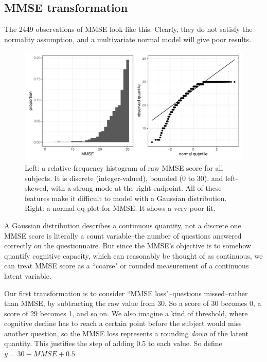 \documentclass[12pt]{article}
\begin{document}
\pagebreak
\subsection{MMSE transformation}

The 2449 observations of MMSE look like this. Clearly, they do not satisfy the normality assumption, and a multivariate normal model will give poor results.

\begin{figure}[H]
\centering
\includegraphics[width=\linewidth]{figures/mmse_before}
\caption{Left: a relative frequency histogram of raw MMSE score for all subjects. It is discrete (integer-valued), bounded (0 to 30), and left-skewed, with a strong mode at the right endpoint. All of these features make it difficult to model with a Gaussian distribution. Right: a normal qq-plot for MMSE. It shows a very poor fit.}
\end{figure}

A Gaussian distribution describes a continuous quantity, not a discrete one. MMSE score is literally a count variable--the number of questions answered correctly on the questionnaire. But since the MMSE's objective is to somehow quantify cognitive capacity, which can reasonably be thought of as continuous, we can treat MMSE score as a ``coarse" or rounded measurement of a continuous latent variable. 

Our first transformation is to consider ``MMSE loss"--questions missed--rather than MMSE, by subtracting the raw value from 30. So a score of 30 becomes 0, a score of 29 becomes 1, and so on. We also imagine a kind of threshold, where cognitive decline has to reach a certain point before the subject would miss another question, so the MMSE loss represents a rounding \textit{down} of the latent quantity. This justifies the step of adding $0.5$ to each value. So define $y = 30 - MMSE + 0.5$. 
\end{document}
